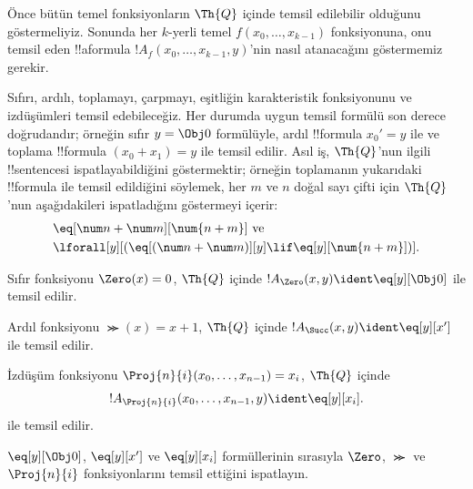 


Önce bütün temel fonksiyonların $\Th{Q}$ içinde temsil edilebilir olduğunu
göstermeliyiz. Sonunda her $k$-yerli temel $f(x_0,\dots,x_{k-1})$
fonksiyonuna, onu temsil eden !!a{formula}
$!A_f(x_0,\dots,x_{k-1},y)$'nin nasıl atanacağını göstermemiz gerekir.

Sıfırı, ardılı, toplamayı, çarpmayı, eşitliğin karakteristik fonksiyonunu ve
izdüşümleri temsil edebileceğiz. Her durumda uygun temsil formülü son derece
doğrudandır; örneğin sıfır $y=\Obj 0$ formülüyle, ardıl !!{formula}
$x_0'=y$ ile ve toplama !!{formula} $(x_0+x_1)=y$ ile temsil edilir. Asıl
iş, $\Th{Q}$'nun ilgili !!{sentence}s{}i ispatlayabildiğini göstermektir;
örneğin toplamanın yukarıdaki !!{formula} ile temsil edildiğini söylemek,
her $m$ ve $n$ doğal sayı çifti için $\Th{Q}$'nun aşağıdakileri ispatladığını
göstermeyi içerir:
\begin{align*}
& \eq[\num n + \num m][\num {n+m}] \text{ ve}\\
& \lforall[y][(\eq[(\num n + \num m)][y] \lif \eq[y][\num{n+m}])].
\end{align*}

\begin{prop}
Sıfır fonksiyonu $\Zero(x)=0$, $\Th{Q}$ içinde
$!A_{\Zero}(x,y) \ident \eq[y][\Obj 0]$ ile temsil edilir.
\end{prop}

\begin{prop}
Ardıl fonksiyonu $\Succ(x)=x+1$, $\Th{Q}$ içinde
$!A_{\Succ}(x,y) \ident \eq[y][x']$ ile temsil edilir.
\end{prop}

\begin{prop}
İzdüşüm fonksiyonu $\Proj{n}{i}(x_0, \dots, x_{n-1})=x_i$, $\Th{Q}$
içinde
\[!A_{\Proj{n}{i}}(x_0, \dots, x_{n-1}, y) \ident \eq[y][x_i].\]
ile temsil edilir.
\end{prop}

\begin{prob}
$\eq[y][\Obj 0]$, $\eq[y][x']$ ve $\eq[y][x_i]$ formüllerinin sırasıyla
$\Zero$, $\Succ$ ve $\Proj{n}{i}$ fonksiyonlarını temsil ettiğini ispatlayın.
\end{prob}


